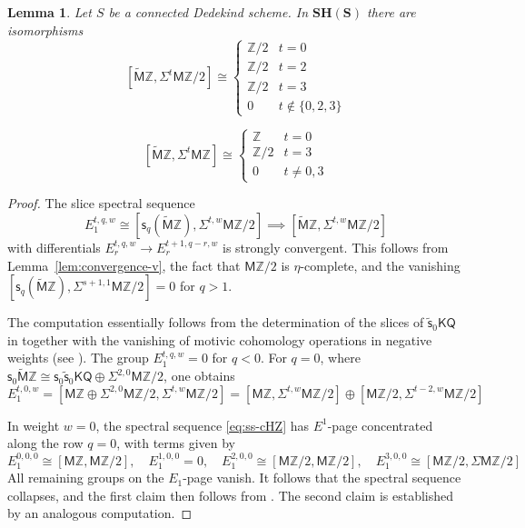 \documentclass[11pt,hyp,english]{article}
\newcommand{\Z}{\mathbb{Z}}
\renewcommand{\S}{\mathbf{S}}
\renewcommand{\AA}{\mathcal{A}}
\newcommand{\KQ}{\mathsf{KQ}}
\newcommand{\MZ}{\mathsf{M}\Z}
\newcommand{\HZ}{\mathsf{M}\Z}
\newcommand{\cHZ}{\wt{{\mathsf{M}}}{\Z}}
\newcommand{\SH}{\mathbf{SH}}
\newcommand{\wt}[1]{\widetilde{#1}}
\newcommand{\s}{\mathsf{s}}
\newcommand{\vs}{\tilde{\mathsf{s}}}
\let\iso=\cong
\newtheorem{lemma}[theorem]{Lemma}
\theoremstyle{definition}
\begin{document}
\begin{lemma}\label{lem:mztilde-weight0}
Let $S$ be a connected Dedekind scheme. 
In $\SH(\S)$ there are isomorphisms
\[
[\cHZ, \Sigma^{t}\HZ/2] 
\cong
\begin{cases}
\Z/2 & t = 0 \\
\Z/2 & t = 2 \\
\Z/2 & t = 3 \\
0 & t \notin \{0, 2, 3\}
\end{cases}
\]

\[
[\cHZ, \Sigma^{t}\HZ] \cong
\begin{cases}
\Z & t = 0 \\
\Z/2 & t = 3 \\
0 & t \neq 0, 3
\end{cases}
\]
\end{lemma}

\begin{proof}
The slice spectral sequence
\begin{equation}
\label{eq:ss-cHZ}
E^{t,q,w}_1 \cong 
[\s_{q}(\cHZ),\Sigma^{t,w}\HZ/2]
\implies 
[\cHZ, \Sigma^{t,w}\HZ/2]
\end{equation}
with differentials $E^{t,q,w}_r \to E^{t+1,q-r,w}_r$ is strongly convergent.
This follows from Lemma~\ref{lem:convergence-v}, the fact that $\MZ/2$ is $\eta$-complete, and the vanishing $[\s_{q}(\cHZ),\Sigma^{s+1,1}\MZ/2]=0$ for $q>1$. 

The computation essentially follows from the determination of the slices of $\vs_0\KQ$ in  together with the vanishing of motivic cohomology operations in negative weights (see ).
The group $E^{t,q,w}_1 = 0$ for $q < 0$.
For $q=0$, where $\s_0\cHZ\iso \s_0\vs_0\KQ\oplus \Sigma^{2,0}\MZ/2$, one obtains 
\[ E^{t,0,w}_1=[\MZ\oplus \Sigma^{2,0}\MZ/2,\Sigma^{t,w}\MZ/2] = [\MZ,\Sigma^{t,w}\MZ/2]\oplus [\MZ/2,\Sigma^{t-2,w}\MZ/2] \]

In weight $w=0$, 
the spectral sequence \eqref{eq:ss-cHZ} has $E^1$-page concentrated along the row $q = 0$, 
with terms given by 
\[
E^{0,0,0}_1\cong [\HZ, \HZ/2],\quad
E^{1,0,0}_1=0,\quad
E^{2,0,0}_1\cong [\HZ/2, \HZ/2],\quad
E^{3,0,0}_1\cong [\HZ/2, \Sigma\HZ/2]
\]
All remaining groups on the $E_1$-page vanish. It follows that the spectral sequence collapses, and the first claim then follows from . The second claim is established by an analogous computation.
\end{proof}
\end{document}

